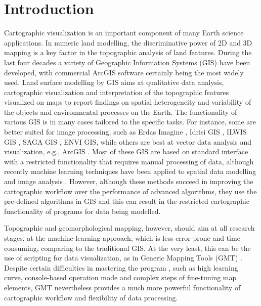 \documentclass[land,article,submit,pdftex,moreauthors]{Definitions/mdpi}
\begin{document}
\section{Introduction}

Cartographic visualization is an important component of many Earth science applications. In numeric land modelling, the discriminative power of 2D and 3D mapping is a key factor in the topographic analysis of land features. During the last four decades a variety of Geographic Information Systems (GIS) have been developed, with commercial ArcGIS software certainly being the most widely used. Land surface modelling by GIS aims at qualitative data analysis, cartographic visualization and interpretation of the topographic features visualized on maps to report findings on spatial heterogeneity and variability of the objects and environmental processes on the Earth. The functionality of various GIS is in many cases tailored to the specific tasks. For instance, some are better suited for image processing, such as Erdas Imagine \cite{IWAHASHI2010202,AHN2010284}, Idrisi GIS \cite{land10040379,AYALEW200515}, ILWIS GIS \cite{HENGL2009309,BABIKER2005127}, SAGA GIS \cite{CHALUPA2018174,Lemenkova2021a}, ENVI GIS, while others are best at vector data analysis and visualization, e.g., ArcGIS \cite{OHTA2022108201,IKEMI2017115,IWAHASHI201229,Klauco2013,NAKAYAMA2023110243,HANAOKA2014274}.
Most of these GIS are based on standard interface with a restricted functionality that requires manual processing of data, although recently machine learning techniques have been applied to spatial data modelling \cite{THONGTHAMMACHART2022105447,MAO2022113082} and image analysis \cite{ALIFU2020107365,CARRASCO2022277}. However, although these methods succeed in improving the cartographic workflow over the performance of advanced algorithms, they use the pre-defined algorithms in GIS and this can result in the restricted cartographic functionality of programs for data being modelled.

Topographic and geomorphological mapping, however, should aim at all research stages, at the machine-learning approach, which is less error-prone and time-consuming, comparing to the traditional GIS. At the very least, this can be the use of scripting for data visualization, as in Generic Mapping Tools (GMT) \cite{FARAG2022229297,data7060074}. Despite certain difficulties in mastering the program \cite{FANG202031}, such as high learning curve, console-based operation mode and complex steps of fine-tuning map elements, GMT nevertheless provides a much more powerful functionality of cartographic workflow and flexibility of data processing. 
\end{document}
